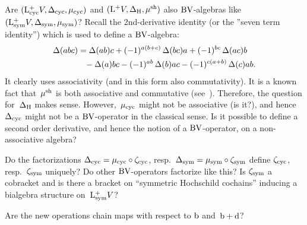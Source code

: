 \documentclass[\MainFolder/Text.tex]{subfiles}
\begin{document}
\begin{Questions}\label{Q:OpenProbBrCo}
\begin{RemarkList}
\item Are $(\mathrm{L}^+_{\mathrm{cyc}} V, \operatorname{\Delta}_{\mathrm{cyc}}, \mu_{\mathrm{cyc}})$ and $(\mathrm{L}^+ V, \operatorname{\Delta}_{\mathrm{H}}, \mu^{\mathrm{sh}})$ also $\mathrm{BV}$-algebras like $(\mathrm{L}_{\mathrm{sym}}^+ V, \operatorname{\Delta}_{\mathrm{sym}}, \mu_{\mathrm{sym}})$? Recall the 2nd-derivative identity (or the ''seven term identity'') which is used to define a $\mathrm{BV}$-algebra:
\begin{equation}\label{Eq:secondderivative}\begin{aligned}
\operatorname{\Delta}(abc) & = \operatorname{\Delta}(ab)c + (-1)^{a(b+c)}\operatorname{\Delta}(bc)a + (-1)^{bc}\operatorname{\Delta}(ac)b \\
&\hphantom{=}{}- \operatorname{\Delta}(a)bc - (-1)^{ab}\operatorname{\Delta}(b)ac - (-1)^{c(a+b)}\operatorname{\Delta}(c)ab.
\end{aligned}\end{equation}
It clearly uses associativity (and in this form also commutativity). It is a known fact that~$\mu^{\mathrm{sh}}$ is both associative and commutative (see~\cite{LodayCyclic}). Therefore, the question for~$\operatorname{\Delta}_{\mathrm{H}}$ makes sense. However,~$\mu_{\mathrm{cyc}}$ might not be associative (is it?), and hence~$\operatorname{\Delta}_{\text{cyc}}$ might not be a $\mathrm{BV}$-operator in the classical sense. Is it possible to define a second order derivative, and hence the notion of a $\mathrm{BV}$-operator, on a non-associative algebra?
\item Do the factorizations $\operatorname{\Delta}_{\mathrm{cyc}} = \mu_{\mathrm{cyc}} \circ \zeta_{\mathrm{cyc}}$, resp.~$\operatorname{\Delta}_{\mathrm{sym}}= \mu_{\mathrm{sym}} \circ \zeta_{\mathrm{sym}}$ define $\zeta_{\mathrm{cyc}}$, resp.~$\zeta_{\mathrm{sym}}$ uniquely? Do other $\mathrm{BV}$-operators factorize like this? Is $\zeta_{\mathrm{sym}}$ a cobracket and is there a bracket on ``symmetric Hochschild cochains'' inducing a bialgebra structure on~$\mathrm{L}_{\mathrm{sym}}^+ V$? 
\item Are the new operations chain maps with respect to $\mathrm{b}$ and~$\mathrm{b} + \mathrm{d}$? 
\qedhere
\end{RemarkList}
\end{Questions}
%
\end{document}
